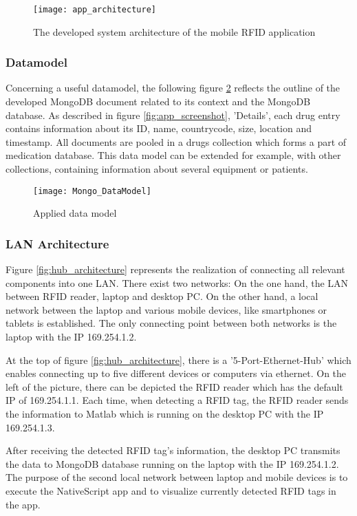 \begin{figure}
\centering
\texttt{[image: app\_architecture]} 
\caption{\label{fig:apparchitecture}The developed system architecture of the mobile RFID application} 
\end{figure}

\subsubsection{Datamodel}

Concerning a useful datamodel, the following figure \ref{fig:datamodel} reflects the outline of the developed MongoDB document related to its context and the MongoDB database. As described in figure \ref{fig:app_screenshot}, 'Details', each drug entry contains information about its ID, name, countrycode, size, location and timestamp. All documents are pooled in a drugs collection which forms a part of medication database. This data model can be extended for example, with other collections, containing information about several equipment or patients. 

\begin{figure}
\centering
\texttt{[image: Mongo\_DataModel]} 
\caption{\label{fig:datamodel}Applied data model} 
\end{figure}

\subsubsection{\ac{LAN} Architecture}

Figure \ref{fig:hub_architecture} represents the realization of connecting all relevant components into one LAN. There exist two networks: On the one hand, the LAN between RFID reader, laptop and desktop PC. On the other hand, a local network between the laptop and various mobile devices, like smartphones or tablets is established. The only connecting point between both networks is the laptop with the IP 169.254.1.2.

At the top of figure \ref{fig:hub_architecture}, there is a '5-Port-Ethernet-Hub' which enables connecting up to five different devices or computers via ethernet. 
On the left of the picture, there can be depicted the RFID reader which has the default IP of 169.254.1.1. Each time, when detecting a RFID tag, the RFID reader sends the information to Matlab which is running on the desktop PC with the IP 169.254.1.3. 

After receiving the detected RFID tag's information, the desktop PC transmits the data to MongoDB database running on the laptop with the IP 169.254.1.2. 
The purpose of the second local network between laptop and mobile devices is to execute the NativeScript app and to visualize currently detected RFID tags in the app.

